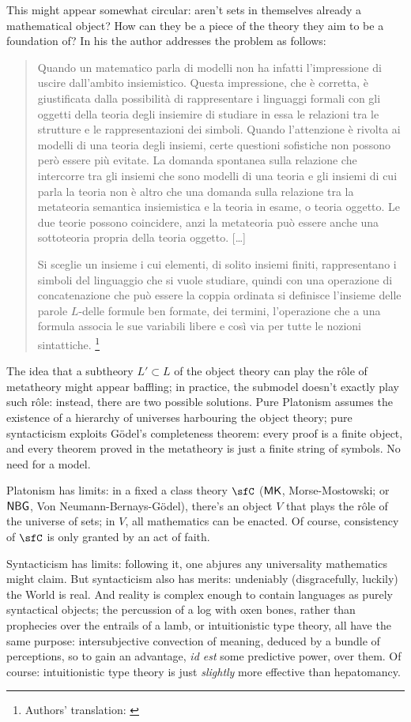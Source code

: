 This might appear somewhat circular: aren't sets in themselves already a mathematical object? How can they be a piece of the theory they aim to be a foundation of? In his \cite{lolli1977categorie} the author addresses the problem as follows:
\begin{quote}
    Quando un matematico parla di modelli non ha infatti l'impressione di uscire dall'ambito insiemistico. Questa impressione, che è corretta, è giustificata dalla possibilità di rappresentare i linguaggi formali con gli oggetti della teoria degli insiemire di studiare in essa le relazioni tra le strutture e le rappresentazioni dei simboli. Quando l'attenzione è rivolta ai modelli di una teoria degli insiemi, certe questioni sofistiche non possono però essere più evitate. La domanda spontanea sulla relazione che intercorre tra gli insiemi che so­no modelli di una teoria e gli insiemi di cui parla la teoria non è altro che una domanda sulla relazione tra la metateoria semantica insiemi­stica e la teoria in esame, o teoria oggetto. Le due teorie possono coincidere, anzi la metateoria può essere anche una sottoteoria pro­pria della teoria oggetto. [\dots\unkern]

    Si sceglie un insieme i cui elementi, di solito insiemi finiti, rappresentano i simboli del linguaggio che si vuole studiare, quindi con una operazione di concatenazione che può essere la coppia ordinata si definisce l'insieme delle parole $L$-delle for­mule ben formate, dei termini, l'operazione che a una formula asso­cia le sue variabili libere e così via per tutte le nozioni sintattiche.
    \footnote{Authors' translation: \emph{}}
\end{quote}
The idea that a subtheory $L'\subset L$ of the object theory can play the r\^ole of metatheory might appear baffling; in practice, the submodel doesn't exactly play such r\^ole: instead, there are two possible solutions. Pure Platonism assumes the existence of a hierarchy of universes harbouring the object theory; pure syntacticism exploits G\"odel's completeness theorem: every proof is a finite object, and every theorem proved in the metatheory is just a finite string of symbols. No need for a model.

Platonism has limits: in a fixed a class theory $\sfC$ ($\sf MK$, Morse-Mostowski; or $\sf NBG$, Von Neumann-Bernays-G\"odel), there's an object $V$ that plays the r\^ole of the universe of sets; in $V$, all mathematics can be enacted. Of course, consistency of $\sfC$ is only granted by an act of faith.

Syntacticism has limits: following it, one abjures any universality mathematics might claim. But syntacticism also has merits: undeniably (disgracefully, luckily) the World is real. And reality is complex enough to contain languages as purely syntactical objects; the percussion of a log with oxen bones, rather than prophecies over the entrails of a lamb, or intuitionistic type theory, all have the same purpose: intersubjective convection of meaning, deduced by a bundle of perceptions, so to gain an advantage, \emph{id est} some predictive power, over them. Of course: intuitionistic type theory is just \emph{slightly} more effective than hepatomancy.

